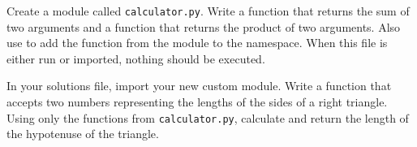 \begin{problem} %
Create a module called \texttt{calculator.py}.
Write a function  that returns the sum of two arguments and a function  that returns the product of two arguments.
Also use  to add the  function from the  module to the namespace.
When this file is either run or imported, nothing should be executed.

In your solutions file, import your new custom module.
Write a function that accepts two numbers representing the lengths of the sides of a right triangle.
Using only the functions from \texttt{calculator.py}, calculate and return the length of the hypotenuse of the triangle.
\end{problem}

